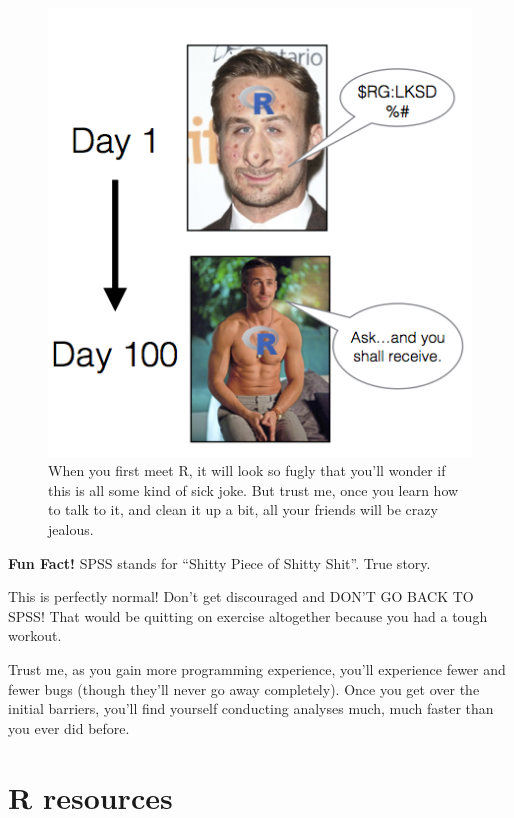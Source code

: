 \documentclass[
]{book}
\begin{document}
\begin{figure}

{\centering \includegraphics[width=5.99in]{images/gosling} 

}

\caption{When you first meet R, it will look so fugly that you'll wonder if this is all some kind of sick joke. But trust me, once you learn how to talk to it, and clean it up a bit, all your friends will be crazy jealous.}\label{fig:gosling}
\end{figure}

\textbf{Fun Fact!} SPSS stands for ``Shitty Piece of Shitty Shit''. True story.

This is perfectly normal! Don't get discouraged and DON'T GO BACK TO SPSS! That would be quitting on exercise altogether because you had a tough workout.

Trust me, as you gain more programming experience, you'll experience fewer and fewer bugs (though they'll never go away completely). Once you get over the initial barriers, you'll find yourself conducting analyses much, much faster than you ever did before.

\hypertarget{r-resources}{%
\section{R resources}\label{r-resources}}
\end{document}
